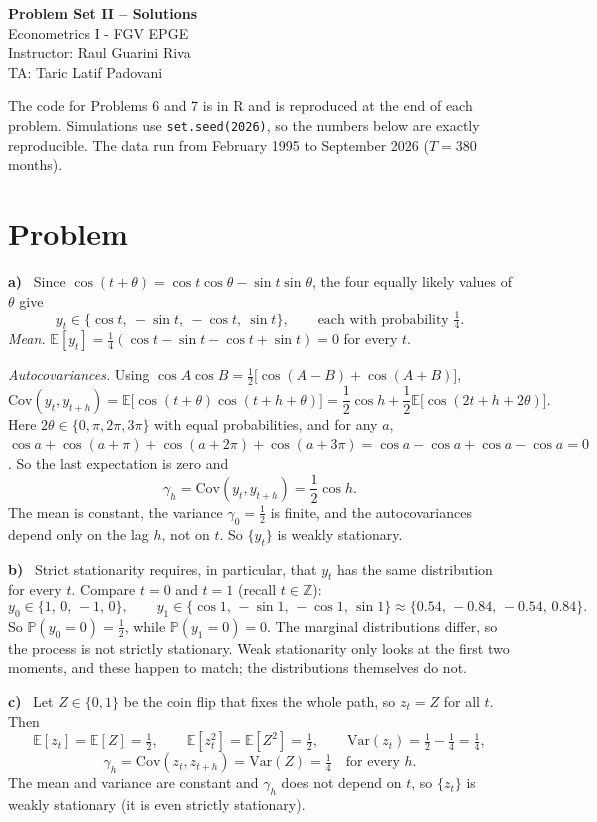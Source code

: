 \documentclass[11pt]{article}
\newcommand{\E}{\mathbb{E}}
\newcommand{\Var}{\mathrm{Var}}
\newcommand{\Cov}{\mathrm{Cov}}
\newcommand{\Prob}{\mathbb{P}}
\newcounter{problem}
\renewcommand{\theproblem}{\arabic{problem}}
\newcommand{\problem}{
	\stepcounter{problem}
	\section*{Problem \theproblem}
}
\newcommand{\itm}[1]{\par\textbf{#1)}\ }
\begin{document}
	\begin{center}
		{\LARGE{\textbf{Problem Set II -- Solutions}}}\\
		\vspace{0.2cm}
		Econometrics I - \textcolor{FGVBlue}{FGV EPGE}\\
		Instructor: Raul Guarini Riva \\
		TA: Taric Latif Padovani
	\end{center}

The code for Problems 6 and 7 is in R and is reproduced at the end of each problem. Simulations use \texttt{set.seed(2026)}, so the numbers below are exactly reproducible. The data run from February 1995 to September 2026 ($T=380$ months).

\problem

\itm{a}
Since $\cos(t+\theta) = \cos t\cos\theta - \sin t\sin\theta$, the four equally likely values of $\theta$ give
\[
y_t\in\big\{\cos t,\ -\sin t,\ -\cos t,\ \sin t\big\},\qquad\text{each with probability } \tfrac14 .
\]
\emph{Mean.} $\E[y_t] = \frac14(\cos t - \sin t - \cos t + \sin t) = 0$ for every $t$.

\emph{Autocovariances.} Using $\cos A\cos B = \frac12\big[\cos(A-B) + \cos(A+B)\big]$,
\[
\Cov(y_t,y_{t+h}) = \E\big[\cos(t+\theta)\cos(t+h+\theta)\big] = \frac12\cos h + \frac12\E\big[\cos(2t+h+2\theta)\big].
\]
Here $2\theta\in\{0,\pi,2\pi,3\pi\}$ with equal probabilities, and for any $a$, $\cos a + \cos(a+\pi) + \cos(a+2\pi) + \cos(a+3\pi) = \cos a-\cos a+\cos a-\cos a = 0$. So the last expectation is zero and
\[
\gamma_h = \Cov(y_t,y_{t+h}) = \frac12\cos h .
\]
The mean is constant, the variance $\gamma_0=\frac12$ is finite, and the autocovariances depend only on the lag $h$, not on $t$. So $\{y_t\}$ is weakly stationary.

\itm{b}
Strict stationarity requires, in particular, that $y_t$ has the same distribution for every $t$. Compare $t=0$ and $t=1$ (recall $t\in\mathbb Z$):
\[
y_0\in\{1,\,0,\,-1,\,0\},\qquad y_1\in\{\cos 1,\,-\sin 1,\,-\cos 1,\,\sin 1\}\approx\{0.54,\,-0.84,\,-0.54,\,0.84\}.
\]
So $\Prob(y_0=0)=\frac12$, while $\Prob(y_1=0)=0$. The marginal distributions differ, so the process is not strictly stationary. Weak stationarity only looks at the first two moments, and these happen to match; the distributions themselves do not.

\itm{c}
Let $Z\in\{0,1\}$ be the coin flip that fixes the whole path, so $z_t=Z$ for all $t$. Then
\[
\E[z_t] = \E[Z] = \tfrac12,\qquad \E[z_t^2] = \E[Z^2] = \tfrac12,\qquad \Var(z_t) = \tfrac12-\tfrac14 = \tfrac14,
\]
\[
\gamma_h = \Cov(z_t,z_{t+h}) = \Var(Z) = \tfrac14\quad\text{for every } h.
\]
The mean and variance are constant and $\gamma_h$ does not depend on $t$, so $\{z_t\}$ is weakly stationary (it is even strictly stationary).
\end{document}
